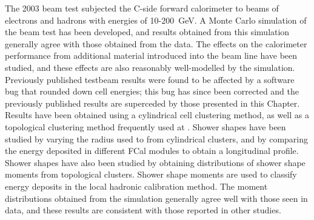 The 2003 beam test subjected the \atlas C-side forward calorimeter to beams of electrons and hadrons with energies of 10-200~GeV. A Monte Carlo simulation of the beam test has been developed, and results obtained from this simulation generally agree with those obtained from the data. The effects on the calorimeter performance from additional material introduced into the beam line have been studied, and these effects are also reasonably well-modelled by the simulation. 
Previously published testbeam results were found to be affected by a software bug that rounded down cell energies; this bug has since been corrected and the previously published results are superceded by those presented in this Chapter. 
Results have been obtained using a cylindrical cell clustering method, as well as a topological clustering method frequently used at \atlas. Shower shapes have been studied by varying the radius used to from cylindrical clusters, and by comparing the energy deposited in different FCal modules to obtain a longitudinal profile. Shower shapes have also been studied by obtaining distributions of shower shape moments from topological clusters. Shower shape moments are used to classify energy deposits in the local hadronic calibration method. The moment distributions obtained from the simulation generally agree well with those seen in data, and these results are consistent with those reported in other studies.




 








 







